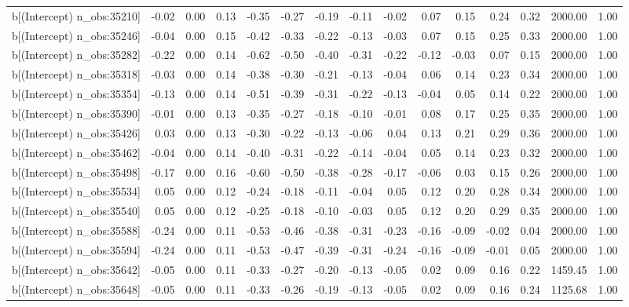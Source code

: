 \begin{table}[ht]
\begin{tabular}{rrrrrrrrrrrrrrr}
  b[(Intercept) n\_obs:35210] & -0.02 & 0.00 & 0.13 & -0.35 & -0.27 & -0.19 & -0.11 & -0.02 & 0.07 & 0.15 & 0.24 & 0.32 & 2000.00 & 1.00 \\ 
  b[(Intercept) n\_obs:35246] & -0.04 & 0.00 & 0.15 & -0.42 & -0.33 & -0.22 & -0.13 & -0.03 & 0.07 & 0.15 & 0.25 & 0.33 & 2000.00 & 1.00 \\ 
  b[(Intercept) n\_obs:35282] & -0.22 & 0.00 & 0.14 & -0.62 & -0.50 & -0.40 & -0.31 & -0.22 & -0.12 & -0.03 & 0.07 & 0.15 & 2000.00 & 1.00 \\ 
  b[(Intercept) n\_obs:35318] & -0.03 & 0.00 & 0.14 & -0.38 & -0.30 & -0.21 & -0.13 & -0.04 & 0.06 & 0.14 & 0.23 & 0.34 & 2000.00 & 1.00 \\ 
  b[(Intercept) n\_obs:35354] & -0.13 & 0.00 & 0.14 & -0.51 & -0.39 & -0.31 & -0.22 & -0.13 & -0.04 & 0.05 & 0.14 & 0.22 & 2000.00 & 1.00 \\ 
  b[(Intercept) n\_obs:35390] & -0.01 & 0.00 & 0.13 & -0.35 & -0.27 & -0.18 & -0.10 & -0.01 & 0.08 & 0.17 & 0.25 & 0.35 & 2000.00 & 1.00 \\ 
  b[(Intercept) n\_obs:35426] & 0.03 & 0.00 & 0.13 & -0.30 & -0.22 & -0.13 & -0.06 & 0.04 & 0.13 & 0.21 & 0.29 & 0.36 & 2000.00 & 1.00 \\ 
  b[(Intercept) n\_obs:35462] & -0.04 & 0.00 & 0.14 & -0.40 & -0.31 & -0.22 & -0.14 & -0.04 & 0.05 & 0.14 & 0.23 & 0.32 & 2000.00 & 1.00 \\ 
  b[(Intercept) n\_obs:35498] & -0.17 & 0.00 & 0.16 & -0.60 & -0.50 & -0.38 & -0.28 & -0.17 & -0.06 & 0.03 & 0.15 & 0.26 & 2000.00 & 1.00 \\ 
  b[(Intercept) n\_obs:35534] & 0.05 & 0.00 & 0.12 & -0.24 & -0.18 & -0.11 & -0.04 & 0.05 & 0.12 & 0.20 & 0.28 & 0.34 & 2000.00 & 1.00 \\ 
  b[(Intercept) n\_obs:35540] & 0.05 & 0.00 & 0.12 & -0.25 & -0.18 & -0.10 & -0.03 & 0.05 & 0.12 & 0.20 & 0.29 & 0.35 & 2000.00 & 1.00 \\ 
  b[(Intercept) n\_obs:35588] & -0.24 & 0.00 & 0.11 & -0.53 & -0.46 & -0.38 & -0.31 & -0.23 & -0.16 & -0.09 & -0.02 & 0.04 & 2000.00 & 1.00 \\ 
  b[(Intercept) n\_obs:35594] & -0.24 & 0.00 & 0.11 & -0.53 & -0.47 & -0.39 & -0.31 & -0.24 & -0.16 & -0.09 & -0.01 & 0.05 & 2000.00 & 1.00 \\ 
  b[(Intercept) n\_obs:35642] & -0.05 & 0.00 & 0.11 & -0.33 & -0.27 & -0.20 & -0.13 & -0.05 & 0.02 & 0.09 & 0.16 & 0.22 & 1459.45 & 1.00 \\ 
  b[(Intercept) n\_obs:35648] & -0.05 & 0.00 & 0.11 & -0.33 & -0.26 & -0.19 & -0.13 & -0.05 & 0.02 & 0.09 & 0.16 & 0.24 & 1125.68 & 1.00 \\ 

\end{tabular}
\end{table}

